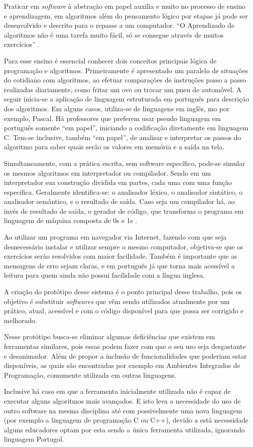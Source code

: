 
Praticar em \textit{software} à abstração em papel auxilia e muito no processo
de ensino e aprendizagem, em algoritmos além do pensamento lógico por etapas já
pode ser desenvolvido e descrito para o repasse a um computador.
``O Aprendizado de algoritmos não é uma tarefa muito fácil, só se consegue
através de muitos exercícios'' \cite{lopesgarcia2002}.

Para esse ensino é essencial conhecer dois conceitos principais lógica de
programação e algoritmos. Primeiramente é apresentado um paralelo de situações
do cotidiano com algoritmos, ao efetuar comparações de instruções passo a passo
realizadas diariamente, como fritar um ovo ou trocar um pneu de automóvel. A
seguir inicia-se a aplicação de linguagem estruturada em português para
descrição dos algoritmos. Em alguns casos, utiliza-se de linguagens em inglês,
mo por exemplo, Pascal. Há professores que preferem usar pseudo linguagem em
português somente ``em papel'', iniciando a codificação diretamente em linguagem
C. Tem-se inclusive, também ``em papel'', de analisar e interpretar os passos do
algoritmo para saber quais serão os valores em memória e a saída na tela.

Simultaneamente, com a prática escrita, sem software específico, pode-se simular
os mesmos algoritmos em interpretador ou compilador. Sendo em um interpretador
sua construção dividida em partes, cada uma com uma função específica.
Geralmente identifica-se: o analisador léxico, o analisador sintático, o
analisador semântico, e o resultado de saída. Caso seja um compilador há, ao
invés de resultado de saída, o gerador de código, que transforma o programa em
linguagem de máquina composta de 0s e 1s \cite{delamaro2004}.

Ao utilizar um programa em navegador via Internet, fazendo com que seja
desnecessário instalar e utilizar sempre o mesmo computador, objetiva-se que os
exercícios serão resolvidos com maior facilidade. Também é importante que as
mensagens de erro sejam claras, e em português já que torna mais acessível a
leitura para quem ainda não possui facilidade com a língua inglesa.

A criação do protótipo desse sistema é o ponto principal desse trabalho, pois os
objetivo é substituir \textit{softwares} que vêm sendo utilizados atualmente por
um prático, atual, acessível e com o código disponível para que possa ser
corrigido e melhorado.

Nesse protótipo busca-se eliminar algumas deficiências que existem em
ferramentas similares, pois essas podem fazer com que o seu uso seja desgastante
e desanimador. Além de propor a inclusão de funcionalidades que poderiam estar
disponíveis, as quais são encontradas por exemplo em Ambientes Integrados de
Programação, comumente utilizada em outras linguagens.


Inclusive há caso em que a ferramenta inicialmente utilizada não é capaz de
executar alguns algoritmos mais avançados. E isto leva a necessidade do uso
de outro software na mesma disciplina até com possivelmente uma nova
linguagem (por exemplo a linguagem de programação C ou C++), devido a está
necessidade alguns educadores optam por esta sendo a única ferramenta utilizada,
ignorando linguagem Portugol.
